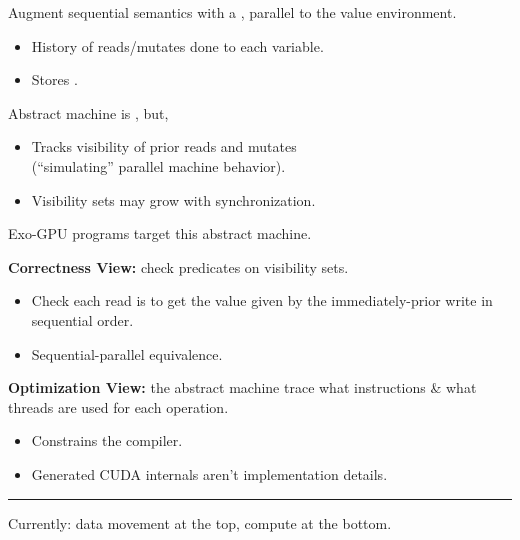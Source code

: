 {\LARGE

Augment sequential semantics with a , parallel to the value environment.
\begin{itemize}
  \item History of reads/mutates done to each variable.
  \item Stores .
\end{itemize}

\vspace{5mm}

Abstract machine is , but,
\begin{itemize}
  \item Tracks visibility of prior reads and mutates\\(``simulating'' parallel machine behavior).
  \item Visibility sets may grow with synchronization.
\end{itemize}

}


\newpage
{}

{\LARGE
Exo-GPU programs target this abstract machine.

\textbf{Correctness View:} check predicates on visibility sets.
\begin{itemize}
  \item Check each read is  to get the value given by the immediately-prior write in sequential order.
  \item Sequential-parallel equivalence.
\end{itemize}

\textbf{Optimization View:} the abstract machine trace  what instructions \& what threads are used for each operation.
\begin{itemize}
  \item Constrains the compiler.
  \item Generated CUDA internals aren't implementation details.
\end{itemize}

}


\newpage
{}

{\large

}

\vspace{3mm}
\hrule

{\LARGE
Currently: data movement at the top, compute at the bottom.
}

